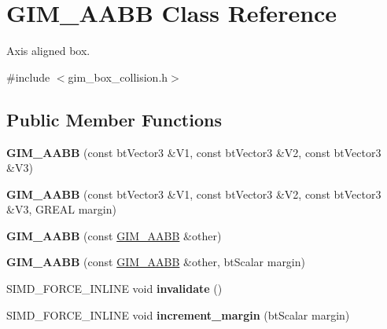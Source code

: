 \hypertarget{class_g_i_m___a_a_b_b}{\section{G\+I\+M\+\_\+\+A\+A\+B\+B Class Reference}
\label{class_g_i_m___a_a_b_b}
}


Axis aligned box.  




{\ttfamily \#include $<$gim\+\_\+box\+\_\+collision.\+h$>$}

\subsection*{Public Member Functions}
\begin{DoxyCompactItemize}
\item 
\hypertarget{class_g_i_m___a_a_b_b_a847be701fed53b0d63ec602bce7652b1}{{\bfseries G\+I\+M\+\_\+\+A\+A\+B\+B} (const bt\+Vector3 \&V1, const bt\+Vector3 \&V2, const bt\+Vector3 \&V3)}\label{class_g_i_m___a_a_b_b_a847be701fed53b0d63ec602bce7652b1}

\item 
\hypertarget{class_g_i_m___a_a_b_b_a371702e73b914b087cb2d489b9c54746}{{\bfseries G\+I\+M\+\_\+\+A\+A\+B\+B} (const bt\+Vector3 \&V1, const bt\+Vector3 \&V2, const bt\+Vector3 \&V3, G\+R\+E\+A\+L margin)}\label{class_g_i_m___a_a_b_b_a371702e73b914b087cb2d489b9c54746}

\item 
\hypertarget{class_g_i_m___a_a_b_b_ab28dc9e3419e00ba699ad8bea92d1cd8}{{\bfseries G\+I\+M\+\_\+\+A\+A\+B\+B} (const \hyperlink{class_g_i_m___a_a_b_b}{G\+I\+M\+\_\+\+A\+A\+B\+B} \&other)}\label{class_g_i_m___a_a_b_b_ab28dc9e3419e00ba699ad8bea92d1cd8}

\item 
\hypertarget{class_g_i_m___a_a_b_b_aa938433d929ff7d8d462d6288f2b6964}{{\bfseries G\+I\+M\+\_\+\+A\+A\+B\+B} (const \hyperlink{class_g_i_m___a_a_b_b}{G\+I\+M\+\_\+\+A\+A\+B\+B} \&other, bt\+Scalar margin)}\label{class_g_i_m___a_a_b_b_aa938433d929ff7d8d462d6288f2b6964}

\item 
\hypertarget{class_g_i_m___a_a_b_b_ac22819a9a73fab28f38d365c580e13b9}{S\+I\+M\+D\+\_\+\+F\+O\+R\+C\+E\+\_\+\+I\+N\+L\+I\+N\+E void {\bfseries invalidate} ()}\label{class_g_i_m___a_a_b_b_ac22819a9a73fab28f38d365c580e13b9}

\item 
\hypertarget{class_g_i_m___a_a_b_b_a803c42d8da1d2bdb73bc5338ae155bc6}{S\+I\+M\+D\+\_\+\+F\+O\+R\+C\+E\+\_\+\+I\+N\+L\+I\+N\+E void {\bfseries increment\+\_\+margin} (bt\+Scalar margin)}\label{class_g_i_m___a_a_b_b_a803c42d8da1d2bdb73bc5338ae155bc6}


\end{DoxyCompactItemize}
